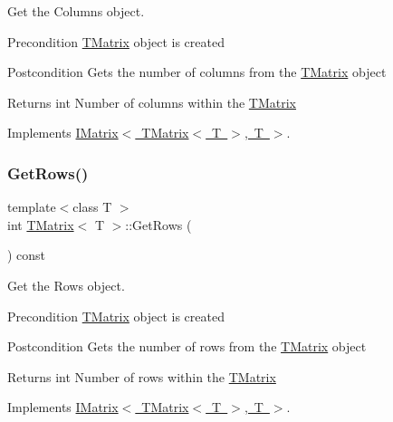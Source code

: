 Get the Columns object. 

\begin{DoxyPrecond}{Precondition}
\mbox{\hyperlink{class_t_matrix}{T\+Matrix}} object is created 
\end{DoxyPrecond}
\begin{DoxyPostcond}{Postcondition}
Gets the number of columns from the \mbox{\hyperlink{class_t_matrix}{T\+Matrix}} object 
\end{DoxyPostcond}
\begin{DoxyReturn}{Returns}
int Number of columns within the \mbox{\hyperlink{class_t_matrix}{T\+Matrix}} 
\end{DoxyReturn}


Implements \mbox{\hyperlink{class_i_matrix_a3b84da3898ef38bdf281c13f218fc278}{I\+Matrix$<$ T\+Matrix$<$ T $>$, T $>$}}.

\mbox{\label{class_t_matrix_a93053319a54bdb1dce4271757b996b64}} 
\subsubsection{\texorpdfstring{GetRows()}{GetRows()}}
{\footnotesize\ttfamily template$<$class T $>$ \\
int \mbox{\hyperlink{class_t_matrix}{T\+Matrix}}$<$ T $>$\+::Get\+Rows (\begin{DoxyParamCaption}{ }\end{DoxyParamCaption}) const\hspace{0.3cm}{\ttfamily [virtual]}}



Get the Rows object. 

\begin{DoxyPrecond}{Precondition}
\mbox{\hyperlink{class_t_matrix}{T\+Matrix}} object is created 
\end{DoxyPrecond}
\begin{DoxyPostcond}{Postcondition}
Gets the number of rows from the \mbox{\hyperlink{class_t_matrix}{T\+Matrix}} object 
\end{DoxyPostcond}
\begin{DoxyReturn}{Returns}
int Number of rows within the \mbox{\hyperlink{class_t_matrix}{T\+Matrix}} 
\end{DoxyReturn}


Implements \mbox{\hyperlink{class_i_matrix_a58632b018f4023768db7963e22f468da}{I\+Matrix$<$ T\+Matrix$<$ T $>$, T $>$}}.

